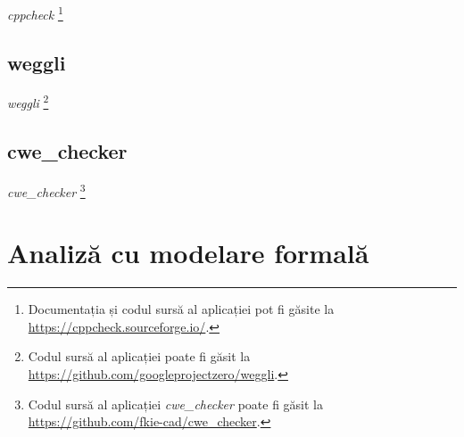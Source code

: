 \textit{cppcheck} \footnote{Documentația și codul sursă al aplicației pot fi găsite la \url{https://cppcheck.sourceforge.io/}.}

\subsection{weggli}

\textit{weggli} \footnote{Codul sursă al aplicației poate fi găsit la \url{https://github.com/googleprojectzero/weggli}.}

\subsection{cwe\_checker} 

\textit{cwe\_checker} \footnote{Codul sursă al aplicației \textit{cwe\_checker} poate fi găsit la \url{https://github.com/fkie-cad/cwe_checker}.}

\section{Analiză cu modelare formală}

